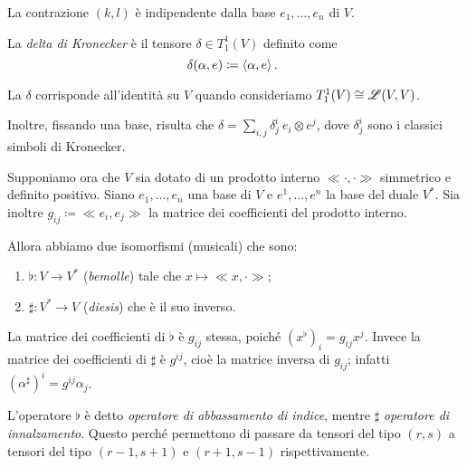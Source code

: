 \begin{remark}
	La contrazione $(k,l)$ è indipendente dalla base $e_1,\ldots,e_n$ di $V$. %
\end{remark}

\begin{definition}  %
	La \emph{delta di Kronecker} è il tensore $\delta \in T_1^1(V)$ definito come
	\begin{equation*}
		\delta(\alpha,e) \coloneqq \langle \alpha , e \rangle\, \text{. }
	\end{equation*}
\end{definition}

\begin{remark}
	La $\delta$ corrisponde all'identità su $V$ quando consideriamo $T_1^1(V) \cong \mathscr L(V,V)$.
	
	Inoltre, fissando una base, risulta che $\delta = \sum_{i,j}\delta_j^i\ e_i\otimes e^j$, dove $\delta_j^i$ sono i classici simboli di Kronecker.
\end{remark}

Supponiamo ora che $V$ sia dotato di un prodotto interno $\ll \cdot, \cdot \gg$ simmetrico e definito positivo. Siano $e_1,\ldots,e_n$ una base di $V$ e $e^1,\ldots,e^n$ la base del duale $V^*$.
Sia inoltre $g_{ij} \coloneqq \ll e_i,e_j\gg$ la matrice dei coefficienti del prodotto interno.

Allora abbiamo due isomorfismi (musicali) che sono:
\begin{enumerate}
	\item $\flat:V\to V^*$ (\emph{bemolle}) tale che $x\mapsto \ll x,\cdot \gg$; 
	\item $\sharp:V^*\to V$ (\emph{diesis}) che è il suo inverso. 
\end{enumerate}

La matrice dei coefficienti di $\flat$ è $g_{ij}$ stessa, poiché $(x^\flat)_i = g_{ij}x^j$.
Invece la matrice dei coefficienti di $\sharp$ è $g^{ij}$, cioè la matrice inversa di $g_{ij}$; infatti $(\alpha^\sharp)^i = g^{ij}\alpha_j$.

L'operatore $\flat$ è detto \emph{operatore di abbassamento di indice}, mentre $\sharp$ \emph{operatore di innalzamento}. Questo perché permettono di passare da tensori del tipo $(r,s)$ a tensori del tipo $(r-1,s+1)$ e $(r+1,s-1)$ rispettivamente.  

